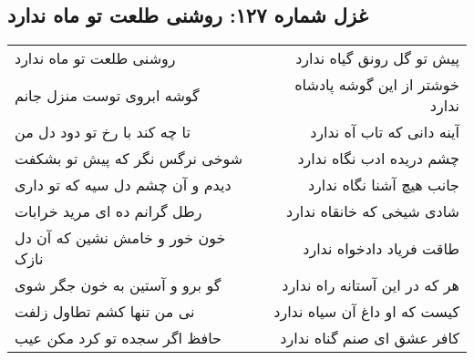 \begin{center}
\section*{غزل شماره ۱۲۷: روشنی طلعت تو ماه ندارد}
\label{sec:sh127}
\begin{longtable}{l p{0.5cm} r}
روشنی طلعت تو ماه ندارد
&&
پیش تو گل رونق گیاه ندارد
\\
گوشه ابروی توست منزل جانم
&&
خوشتر از این گوشه پادشاه ندارد
\\
تا چه کند با رخ تو دود دل من
&&
آینه دانی که تاب آه ندارد
\\
شوخی نرگس نگر که پیش تو بشکفت
&&
چشم دریده ادب نگاه ندارد
\\
دیدم و آن چشم دل سیه که تو داری
&&
جانب هیچ آشنا نگاه ندارد
\\
رطل گرانم ده ای مرید خرابات
&&
شادی شیخی که خانقاه ندارد
\\
خون خور و خامش نشین که آن دل نازک
&&
طاقت فریاد دادخواه ندارد
\\
گو برو و آستین به خون جگر شوی
&&
هر که در این آستانه راه ندارد
\\
نی من تنها کشم تطاول زلفت
&&
کیست که او داغ آن سیاه ندارد
\\
حافظ اگر سجده تو کرد مکن عیب
&&
کافر عشق ای صنم گناه ندارد
\\
\end{longtable}
\end{center}
